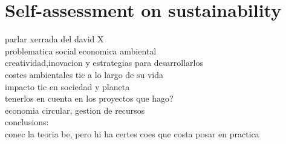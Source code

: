 
\chapter{Self-assessment on sustainability} %

\label{Chapter1}

parlar xerrada del david X\\
problematica social economica ambiental\\
creatividad,inovacion y estrategias para desarrollarlos\\
costes ambientales tic a lo largo de su vida\\
impacto tic en sociedad y planeta\\
tenerlos en cuenta en los proyectos que hago?\\
economia circular, gestion de recursos\\

conclusions:\\
conec la teoria be, pero hi ha certes coes que costa posar en practica\\



